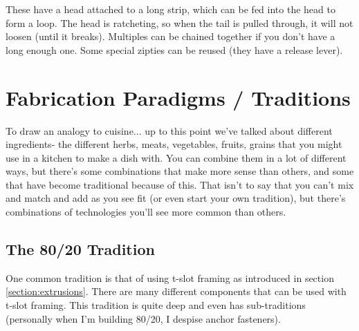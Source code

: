 \documentclass[10pt,letterpaper]{book}
\begin{document}
	These have a head attached to a long strip, which can be fed into the head to form a loop. The head is ratcheting, so when the tail is pulled through, it will not loosen (until it breaks). Multiples can be chained together if you don't have a long enough one. Some special zipties can be reused (they have a release lever).

	\section{Fabrication Paradigms / Traditions}
	To draw an analogy to cuisine... up to this point we've talked about different ingredients- the different herbs, meats, vegetables, fruits, grains that you might use in a kitchen to make a dish with. You can combine them in a lot of different ways, but there's some combinations that make more sense than others, and some that have become traditional because of this. That isn't to say that you can't mix and match and add as you see fit (or even start your own tradition), but there's combinations of technologies you'll see more common than others. 
	
	\subsection{The 80/20 Tradition}
	One common tradition is that of using t-slot framing as introduced in section \ref{section:extrusions}. There are many different components that can be used with t-slot framing. This tradition is quite deep and even has sub-traditions (personally when I'm building 80/20, I despise anchor fasteners).
	
\end{document}
